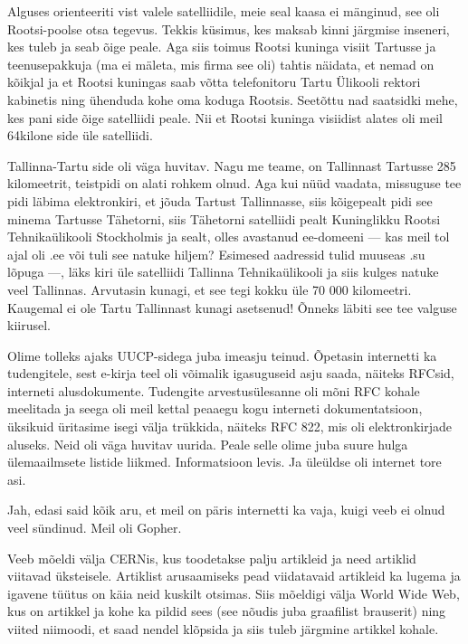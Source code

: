 Alguses orienteeriti vist valele satelliidile, meie seal kaasa ei mänginud, see 
oli Rootsi-poolse otsa tegevus. Tekkis küsimus, kes maksab kinni
järgmise inseneri, kes tuleb ja seab õige peale. Aga siis toimus
Rootsi kuninga visiit Tartusse ja teenusepakkuja (ma ei mäleta, mis firma 
see oli) tahtis näidata, et nemad on kõikjal ja et Rootsi kuningas saab võtta 
telefonitoru Tartu Ülikooli rektori kabinetis ning ühenduda kohe oma koduga 
Rootsis. Seetõttu nad saatsidki mehe, kes pani side õige satelliidi peale. 
Nii et Rootsi kuninga visiidist alates oli meil 64kilone side üle satelliidi. 

Tallinna-Tartu side oli väga huvitav. Nagu me teame, on Tallinnast Tartusse 285 kilomeetrit, teistpidi on alati rohkem olnud. Aga kui 
nüüd vaadata, missuguse tee pidi läbima elektronkiri, et jõuda Tartust 
Tallinnasse, siis kõigepealt pidi see minema Tartusse Tähetorni, siis Tähetorni 
satelliidi pealt Kuninglikku Rootsi Tehnikaülikooli Stockholmis ja sealt, olles 
avastanud ee-domeeni --- kas meil tol ajal oli .ee või tuli see natuke hiljem? 
Esimesed aadressid tulid muuseas .su lõpuga ---, läks kiri üle satelliidi 
Tallinna Tehnikaülikooli ja siis kulges natuke veel Tallinnas. Arvutasin kunagi, et see tegi
kokku üle 70 000 kilomeetri\label{sisu!70k}. Kaugemal ei ole Tartu 
Tallinnast kunagi asetsenud! Õnneks läbiti see tee valguse kiirusel. 


Olime tolleks ajaks UUCP-sidega juba imeasju teinud. 
Õpetasin internetti ka tudengitele, sest e-kirja teel oli 
võimalik igasuguseid asju saada, näiteks RFCsid, interneti 
alusdokumente. Tudengite 
arvestusülesanne oli mõni RFC kohale meelitada ja seega oli meil kettal 
peaaegu kogu interneti dokumentatsioon, üksikuid üritasime isegi 
välja trükkida, näiteks RFC 822, mis oli elektronkirjade aluseks. Neid oli väga huvitav uurida. Peale selle olime juba suure hulga ülemaailmsete 
listide liikmed. Informatsioon levis. Ja üleüldse oli internet tore asi. 


Jah, edasi said kõik aru, et meil on päris internetti ka vaja, kuigi 
veeb ei olnud veel sündinud. Meil oli Gopher.

Veeb mõeldi välja CERNis, kus
toodetakse palju artikleid ja need artiklid viitavad üksteisele. 
Artiklist arusaamiseks pead viidatavaid artikleid ka lugema ja 
igavene tüütus on käia neid kuskilt otsimas. Siis mõeldigi välja 
World Wide Web, kus on artikkel ja kohe ka pildid sees (see nõudis 
juba graafilist brauserit) ning viited niimoodi, et saad nendel klõpsida 
ja siis tuleb järgmine artikkel kohale. 

